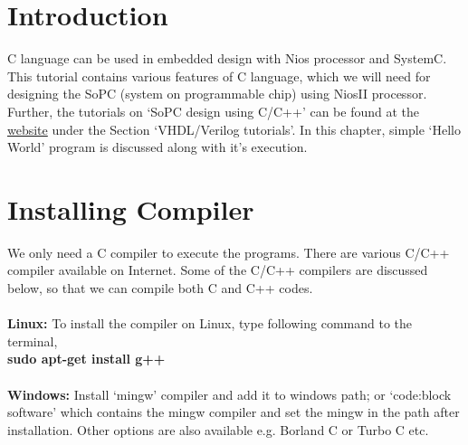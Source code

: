 \section{Introduction}
C language can be used in embedded design with Nios processor and SystemC. This tutorial contains various features of C language, which we will need for designing the SoPC (system on programmable chip) using NiosII processor. Further, the tutorials on `SoPC design using C/C++' can be found at the \href{http://pythondsp.readthedocs.io/en/latest/pythondsp/toc.html}{website} under the Section `VHDL/Verilog tutorials'.  In this chapter, simple `Hello World' program is discussed along with it's execution. 



\section{Installing Compiler}
We only need a C compiler to execute the programs. There are various C/C++ compiler available on Internet. Some of the C/C++ compilers are discussed below, so that we can compile both C and C++ codes. 
\\ \\
\textbf{Linux:} To install the compiler on Linux, type following command to the terminal, \\
\textbf{\textdollar  { \ }  sudo apt-get install g++}
\\ \\
\textbf{Windows:} Install `mingw' compiler and add it to windows path; or `code:block software' which contains the mingw compiler and set the mingw in the path after installation. Other options are also available e.g. Borland C or Turbo C etc.

